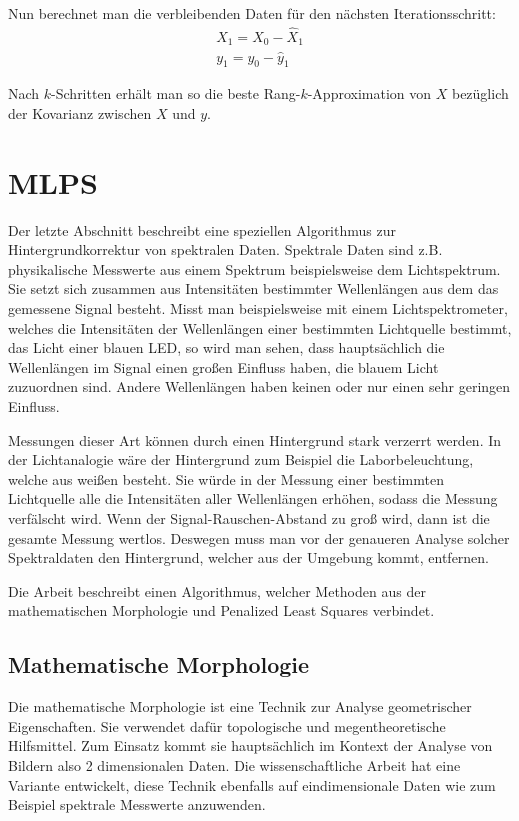 \documentclass{article}
\begin{document}
Nun berechnet man die verbleibenden Daten für den nächsten Iterationsschritt:
\begin{align*}
    X_1 = X_0 - \hat{X}_1 \\
    y_1 = y_0 - \hat{y}_1
\end{align*}

Nach $k$-Schritten erhält man so die beste Rang-$k$-Approximation von $X$ bezüglich der Kovarianz zwischen $X$ und $y$.

\section{MLPS}

Der letzte Abschnitt beschreibt eine speziellen Algorithmus zur Hintergrundkorrektur von spektralen Daten.
Spektrale Daten sind z.B. physikalische Messwerte aus einem Spektrum beispielsweise dem Lichtspektrum. 
Sie setzt sich zusammen aus Intensitäten bestimmter Wellenlängen aus dem das gemessene Signal besteht. 
Misst man beispielsweise mit einem Lichtspektrometer, welches die Intensitäten der Wellenlängen einer bestimmten Lichtquelle bestimmt, das Licht einer blauen LED,
so wird man sehen, dass hauptsächlich die Wellenlängen im Signal einen großen Einfluss haben, die blauem Licht zuzuordnen sind. Andere Wellenlängen haben keinen oder nur einen sehr geringen Einfluss.

Messungen dieser Art können durch einen Hintergrund stark verzerrt werden. In der Lichtanalogie wäre der Hintergrund zum Beispiel die Laborbeleuchtung, welche aus weißen besteht. 
Sie würde in der Messung einer bestimmten Lichtquelle alle die Intensitäten aller Wellenlängen erhöhen, sodass die Messung verfälscht wird.
Wenn der Signal-Rauschen-Abstand zu groß wird, dann ist die gesamte Messung wertlos. Deswegen muss man vor der genaueren Analyse solcher Spektraldaten den Hintergrund, welcher aus der Umgebung kommt, entfernen.

Die Arbeit beschreibt einen Algorithmus, welcher Methoden aus der mathematischen Morphologie und Penalized Least Squares verbindet.

\subsection{Mathematische Morphologie}
Die mathematische Morphologie ist eine Technik zur Analyse geometrischer Eigenschaften.
Sie verwendet dafür topologische und megentheoretische Hilfsmittel. Zum Einsatz kommt sie hauptsächlich im Kontext der Analyse von Bildern also 2 dimensionalen Daten.
Die wissenschaftliche Arbeit hat eine Variante entwickelt, diese Technik ebenfalls auf eindimensionale Daten wie zum Beispiel spektrale Messwerte anzuwenden.
\end{document}
